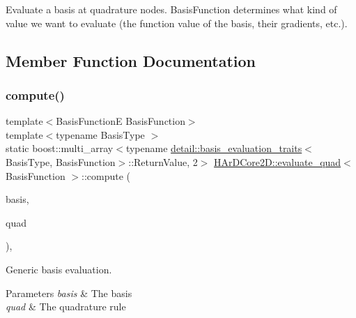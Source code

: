 Evaluate a basis at quadrature nodes. \textquotesingle{}Basis\+Function\textquotesingle{} determines what kind of value we want to evaluate (the function value of the basis, their gradients, etc.). 

\subsection{Member Function Documentation}
\mbox{\label{structHArDCore2D_1_1evaluate__quad_a687c3c9504c4b10c5a18654530980086}} 
\subsubsection{\texorpdfstring{compute()}{compute()}\hspace{0.1cm}{\footnotesize\ttfamily [1/2]}}
{\footnotesize\ttfamily template$<$Basis\+FunctionE Basis\+Function$>$ \\
template$<$typename Basis\+Type $>$ \\
static boost\+::multi\+\_\+array$<$typename \hyperlink{structHArDCore2D_1_1detail_1_1basis__evaluation__traits}{detail\+::basis\+\_\+evaluation\+\_\+traits}$<$Basis\+Type, Basis\+Function$>$\+::Return\+Value, 2$>$ \hyperlink{structHArDCore2D_1_1evaluate__quad}{H\+Ar\+D\+Core2\+D\+::evaluate\+\_\+quad}$<$ Basis\+Function $>$\+::compute (\begin{DoxyParamCaption}\item[{const Basis\+Type \&}]{basis,  }\item[{const Quadrature\+Rule \&}]{quad }\end{DoxyParamCaption})\hspace{0.3cm}{\ttfamily [inline]}, {\ttfamily [static]}}



Generic basis evaluation. 


\begin{DoxyParams}{Parameters}
{\em basis} & The basis \\
\hline
{\em quad} & The quadrature rule \\
\hline
\end{DoxyParams}
\mbox{\label{structHArDCore2D_1_1evaluate__quad_a06cedf0c3440b94b9974922c72ea7c11}} 
